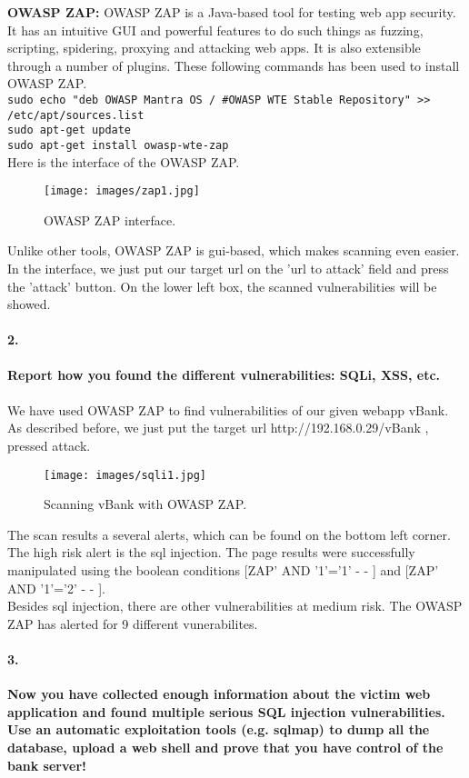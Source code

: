 \documentclass[12pt]{report}
\begin{document}
	{\bf OWASP ZAP: } OWASP ZAP is a Java-based tool for testing web app security. It has an intuitive GUI and powerful features to do such things as fuzzing, scripting, spidering, proxying and attacking web apps. It is also extensible through a number of plugins. These following commands has been used to install OWASP ZAP.\\
	{\tt sudo echo "deb OWASP Mantra OS / \#OWASP WTE Stable Repository" >> /etc/apt/sources.list}\\
	{\tt sudo apt-get update}\\
	{\tt sudo apt-get install owasp-wte-zap}\\
	
	Here is the interface of the OWASP ZAP.
	\begin{figure}[H]
		\texttt{[image: images/zap1.jpg]}
		\caption{OWASP ZAP interface.}
	\end{figure}
	
	Unlike other tools, OWASP ZAP is gui-based, which makes scanning even easier. In the interface, we just put our target url on the 'url to attack' field and press the 'attack' button. On the lower left box, the scanned vulnerabilities will be showed.
	
	\paragraph*{2.}{\bf Report how you found the different vulnerabilities: SQLi, XSS, etc.}\\\\
	
	We have used OWASP ZAP to find vulnerabilities of our given webapp vBank. As described before, we just put the target url {\sf http://192.168.0.29/vBank} ,  pressed attack. 
	\begin{figure}[H]
		\texttt{[image: images/sqli1.jpg]}
		\caption{Scanning vBank with OWASP ZAP.}
	\end{figure}
	
	The scan results a several alerts, which can be found on the bottom left corner. The high risk alert is the sql injection. The page results were successfully manipulated using the boolean conditions [ZAP' AND '1'='1' - - ] and [ZAP' AND '1'='2' - - ].\\
	Besides sql injection, there are other vulnerabilities at medium risk. The OWASP ZAP has alerted for 9 different vunerabilites.\\
	
	\paragraph*{3.}{\bf Now you have collected enough information about the victim web application and found multiple serious SQL injection vulnerabilities.\\
	Use an automatic exploitation tools (e.g. sqlmap) to dump all the database, upload a web shell and prove that you have control of the bank server!}\\\\
\end{document}
